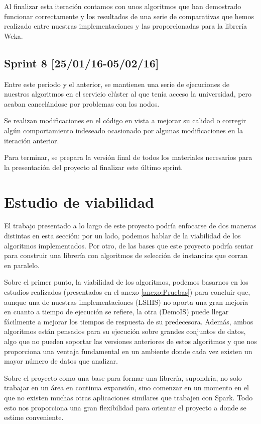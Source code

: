 Al finalizar esta iteración contamos con unos algoritmos que han demostrado funcionar correctamente y los resultados de una serie de comparativas que hemos realizado entre nuestras implementaciones y las proporcionadas para la librería Weka.

\subsection{Sprint 8 [25/01/16-05/02/16]}

Entre este periodo y el anterior, se mantienen una serie de ejecuciones de nuestros algoritmos en el servicio clúster al que tenía acceso la universidad, pero acaban cancelándose por problemas con los nodos.

Se realizan modificaciones en el código en vista a mejorar su calidad o corregir algún comportamiento indeseado ocasionado por algunas modificaciones en la iteración anterior.

Para terminar, se prepara la versión final de todos los materiales necesarios para la presentación del proyecto al finalizar este último sprint.


\section{Estudio de viabilidad}

El trabajo presentado a lo largo de este proyecto podría enfocarse de dos maneras distintas en esta sección: por un lado, podemos hablar de la viabilidad de los algoritmos implementados. Por otro, de las bases que este proyecto podría sentar para construir una librería con algoritmos de selección de instancias que corran en paralelo.

Sobre el primer punto, la viabilidad de los algoritmos, podemos basarnos en los estudios realizados (presentados en el anexo \ref{anexo:Pruebas}) para concluir que, aunque una de nuestras implementaciones (LSHIS) no aporta una gran mejoría en cuanto a tiempo de ejecución se refiere, la otra (DemoIS) puede llegar fácilmente a mejorar los tiempos de respuesta de su predecesora. Además, ambos algoritmos están pensados para su ejecución sobre grandes conjuntos de datos, algo que no pueden soportar las versiones anteriores de estos algoritmos y que nos proporciona una ventaja fundamental en un ambiente donde cada vez existen un mayor número de datos que analizar.

Sobre el proyecto como una base para formar una librería, supondría, no solo trabajar en un área en continua expansión, sino comenzar en un momento en el que no existen muchas otras aplicaciones similares que trabajen con Spark. Todo esto nos proporciona una gran flexibilidad para orientar el proyecto a donde se estime conveniente.

